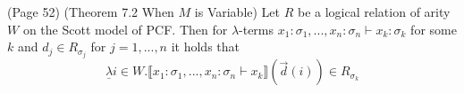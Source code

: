 (Page 52) (Theorem 7.2 When $M$ is Variable) Let $R$ be a logical relation of arity $W$ on the Scott model of PCF. Then for $\lambda$-terms $x_1:\sigma_1, ..., x_n:\sigma_n \vdash x_k:\sigma_k$ for some $k$ and $d_j \in R_{\sigma_j}$ for $j =1, ..., n$ it holds that 
$$ \underline{\lambda} i \in W. \llbracket x_1:\sigma_1, ..., x_n : \sigma_n \vdash x_k \rrbracket (\vec{d}(i)) \in R_{\sigma_k} $$